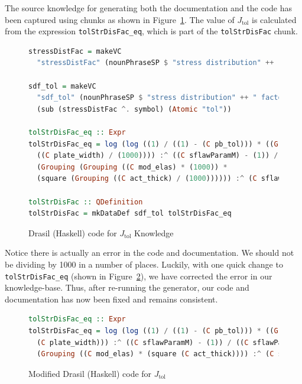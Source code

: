 \documentclass[sigconf]{acmart}
\newcommand{\jtol}{$J_{\mbox{tol}}$}
\newcommand{\inlHask}[1]{\lstinline[language=Haskell, frame=single, showstringspaces=false]{#1}}
\begin{document}
The source knowledge for generating both the documentation and the code has been
captured using chunks as shown in Figure~\ref{Fig_JtolDrasil}. The value of 
\jtol{} is calculated from the expression {\inlHask{tolStrDisFac_eq}}, which is 
part of the {\inlHask{tolStrDisFac}} chunk.

\begin{figure}
\begin{lstlisting}[language=Haskell, frame=single, showstringspaces=false] 
stressDistFac = makeVC 
  "stressDistFac" (nounPhraseSP $ "stress distribution" ++ " factor (Function)") cJ

sdf_tol = makeVC 
  "sdf_tol" (nounPhraseSP $ "stress distribution" ++ " factor (Function) based on Pbtol") 
  (sub (stressDistFac ^. symbol) (Atomic "tol"))

tolStrDisFac_eq :: Expr
tolStrDisFac_eq = log (log ((1) / ((1) - (C pb_tol))) * ((Grouping (((C plate_len) / (1000)) * 
  ((C plate_width) / (1000)))) :^ ((C sflawParamM) - (1)) / ((C sflawParamK) * 
  (Grouping (Grouping ((C mod_elas) * (1000)) * 
  (square (Grouping ((C act_thick) / (1000)))))) :^ (C sflawParamM) * (C loadDF))))

tolStrDisFac :: QDefinition
tolStrDisFac = mkDataDef sdf_tol tolStrDisFac_eq
\end{lstlisting}
\caption{Drasil (Haskell) code for \jtol{} Knowledge}
\label{Fig_JtolDrasil}
\end{figure}

Notice there is actually an error in the code and documentation. We should not 
be dividing by 1000 in a number of places. Luckily, with one quick change to 
{\inlHask{tolStrDisFac_eq}} (shown in Figure~\ref{Fig_JtolDrasil_fix}), we have 
corrected the error in our knowledge-base. Thus, after re-running the generator,
our code and documentation has now been fixed and remains consistent.

\begin{figure}
\begin{lstlisting}[language=Haskell, frame=single, showstringspaces=false]
tolStrDisFac_eq :: Expr
tolStrDisFac_eq = log (log ((1) / ((1) - (C pb_tol))) * ((Grouping ((C plate_len) * 
  (C plate_width))) :^ ((C sflawParamM) - (1)) / ((C sflawParamK) * 
  (Grouping ((C mod_elas) * (square (C act_thick)))) :^ (C sflawParamM) * (C loadDF))))
\end{lstlisting}
\caption{Modified Drasil (Haskell) code for \jtol{}}
\label{Fig_JtolDrasil_fix}
\end{figure}
\end{document}
